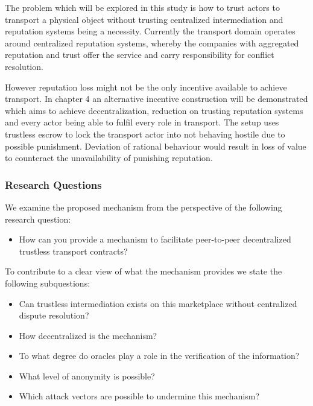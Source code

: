 The problem which will be explored in this study is how to trust actors to transport a physical object without trusting centralized intermediation and reputation systems being a necessity. Currently the transport domain operates around centralized reputation systems, whereby the companies with aggregated reputation and trust offer the service and carry responsibility for conflict resolution.\par
However reputation loss might not be the only incentive available to achieve transport. In chapter 4 an alternative incentive construction will be demonstrated which aims to achieve decentralization, reduction on trusting reputation systems and every actor being able to fulfil every role in transport. The setup uses trustless escrow to lock the transport actor into not behaving hostile due to possible punishment. Deviation of rational behaviour would result in loss of value to counteract the unavailability of punishing reputation.

\subsubsection{Research Questions}

\bigbreak
\noindent We examine the proposed mechanism from the perspective of the following research question:
\begin{itemize}
  \item How can you provide a mechanism to facilitate peer-to-peer decentralized trustless transport contracts?
\end{itemize}
\bigbreak
\noindent To contribute to a clear view of what the mechanism provides we state the following subquestions:
\bigbreak
\begin{itemize}
  \item Can trustless intermediation exists on this marketplace without centralized dispute resolution?
  \item How decentralized is the mechanism?
  \item To what degree do oracles play a role in the verification of the information?
  \item What level of anonymity is possible?
  \item Which attack vectors are possible to undermine this mechanism?
\end{itemize}

